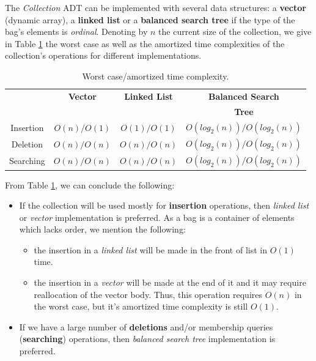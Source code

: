 The \emph{Collection} ADT can be implemented with several data structures: a \textbf{vector} (dynamic array), a \textbf{linked list} or a \textbf{balanced search tree} if the type of the bag's elements is \emph{ordinal}. Denoting by $n$ the current size of the collection, we give in Table \ref{tab:collection1} the worst case as well as the amortized \cite{Cormen09Introduction} time complexities of the collection's operations for different implementations.

\begin{table}
\centering
\begin{tabular}{|c|c|c|c|}
\hline
&\textbf{Vector}&\textbf{Linked List}&\textbf{Balanced Search}\\
&&&\textbf{Tree}\\

\hline
Insertion& $O(n)/O(1)$& $O(1)/O(1)$ & $O(log_2(n))/O(log_2(n))$ \\
Deletion&$O(n)/O(n)$& $O(n)/O(n)$ & $O(log_2(n))/O(log_2(n))$ \\
Searching&$O(n)/O(n)$& $O(n)/O(n)$ & $O(log_2(n))/O(log_2(n))$\\
\hline
\end{tabular}
\caption{Worst case/amortized time complexity.}
\label{tab:collection1}
\end{table}

From Table \ref{tab:collection1}, we can conclude the following:

\begin{itemize}

\item If the collection will be used mostly for \textbf{insertion} operations, then  \emph{linked list} or \emph{vector} implementation is preferred. As a bag is a container of elements which lacks order, we mention the following:
\begin{itemize}
\item the insertion in a \emph{linked list} will be made in the front of list in $O(1)$ time.

\item the insertion in a \emph{vector} will be made at the end of it and it may require reallocation of the vector body. Thus, this operation requires $O(n)$ in the worst case, but it's amortized time complexity is still $O(1)$.
\end{itemize}


\item If we have a large number of \textbf{deletions} and/or membership queries (\textbf{searching}) operations, then  \emph{balanced search tree} implementation is preferred.

\end{itemize}

